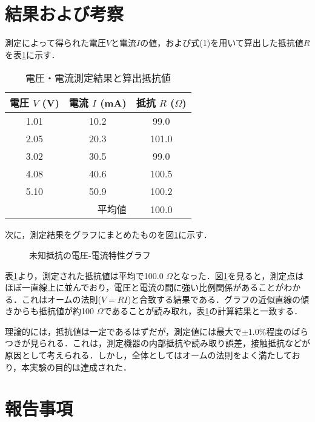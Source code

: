 \documentclass{ltjsarticle}
\begin{document}
\section{結果および考察}
測定によって得られた電圧$V$と電流$I$の値，および式(1)を用いて算出した抵抗値$R$を表\ref{tab:results}に示す．

\begin{table}[h]
\centering
\caption{電圧・電流測定結果と算出抵抗値}
\label{tab:results}
\begin{tabular}{ccc}
\hline
電圧 $V$ (V) & 電流 $I$ (mA) & 抵抗 $R$ ($\Omega$) \\
\hline
1.01 & 10.2 & 99.0 \\
2.05 & 20.3 & 101.0 \\
3.02 & 30.5 & 99.0 \\
4.08 & 40.6 & 100.5 \\
5.10 & 50.9 & 100.2 \\
\hline
\multicolumn{2}{r}{平均値} & 100.0 \\
\hline
\end{tabular}
\end{table}

次に，測定結果をグラフにまとめたものを図\ref{fig:vi_graph}に示す．

\begin{figure}[h]
\centering
\caption{未知抵抗の電圧-電流特性グラフ}
\label{fig:vi_graph}
\end{figure}

表\ref{tab:results}より，測定された抵抗値は平均で100.0 $\Omega$となった．図\ref{fig:vi_graph}を見ると，測定点はほぼ一直線上に並んでおり，電圧と電流の間に強い比例関係があることがわかる．これはオームの法則($V=RI$)と合致する結果である．グラフの近似直線の傾きからも抵抗値が約100 $\Omega$であることが読み取れ，表\ref{tab:results}の計算結果と一致する．

理論的には，抵抗値は一定であるはずだが，測定値には最大で$\pm 1.0 \%$程度のばらつきが見られる．これは，測定機器の内部抵抗や読み取り誤差，接触抵抗などが原因として考えられる．しかし，全体としてはオームの法則をよく満たしており，本実験の目的は達成された．

\section{報告事項}
\end{document}
